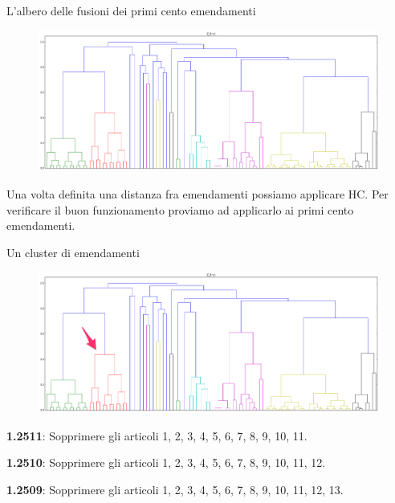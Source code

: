 \documentclass[12pt]{beamer}
\begin{document}
  \begin{frame}{L'albero delle fusioni dei primi cento emendamenti}
    \begin{figure}
      \centering
      \includegraphics[width=\textwidth]{tex/img/tree-first}
    \end{figure}

    \vspace{0.25cm}

    Una volta definita una distanza fra emendamenti possiamo applicare HC\@.
    Per verificare il buon funzionamento proviamo ad applicarlo ai primi cento
    emendamenti.
  \end{frame}

  \begin{frame}{Un cluster di emendamenti}
    \begin{figure}
      \centering
      \includegraphics[width=\textwidth]{tex/img/tree-first-first-cluster}
    \end{figure}

    \vspace{0.25cm}

    {
      \scriptsize
      \textbf{1.2511}: Sopprimere gli articoli 1, 2, 3, 4, 5, 6, 7, 8, 9, 10, 11.

      \textbf{1.2510}: Sopprimere gli articoli 1, 2, 3, 4, 5, 6, 7, 8, 9, 10, 11, 12.

      \textbf{1.2509}: Sopprimere gli articoli 1, 2, 3, 4, 5, 6, 7, 8, 9, 10, 11, 12, 13.

    }
  \end{frame}
\end{document}
